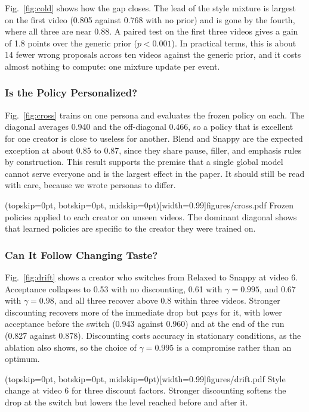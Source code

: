 \documentclass{ieeeaccess}
\begin{document}
Fig.~\ref{fig:cold} shows how the gap closes. The lead of the style mixture is largest on the first video (0.805 against 0.768 with no prior) and is gone by the fourth, where all three are near 0.88. A paired test on the first three videos gives a gain of 1.8 points over the generic prior ($p<0.001$). In practical terms, this is about 14 fewer wrong proposals across ten videos against the generic prior, and it costs almost nothing to compute: one mixture update per event.

\subsubsection{Is the Policy Personalized?}
Fig.~\ref{fig:cross} trains on one persona and evaluates the frozen policy on each. The diagonal averages 0.940 and the off-diagonal 0.466, so a policy that is excellent for one creator is close to useless for another. Blend and Snappy are the expected exception at about 0.85 to 0.87, since they share pause, filler, and emphasis rules by construction. This result supports the premise that a single global model cannot serve everyone and is the largest effect in the paper. It should still be read with care, because we wrote personas to differ.

\Figure[t!](topskip=0pt, botskip=0pt, midskip=0pt)[width=0.99\columnwidth]{figures/cross.pdf}
{Frozen policies applied to each creator on unseen videos. The dominant diagonal shows that learned policies are specific to the creator they were trained on.\label{fig:cross}}

\subsubsection{Can It Follow Changing Taste?}
Fig.~\ref{fig:drift} shows a creator who switches from Relaxed to Snappy at video 6. Acceptance collapses to 0.53 with no discounting, 0.61 with $\gamma=0.995$, and 0.67 with $\gamma=0.98$, and all three recover above 0.8 within three videos. Stronger discounting recovers more of the immediate drop but pays for it, with lower acceptance before the switch (0.943 against 0.960) and at the end of the run (0.827 against 0.878). Discounting costs accuracy in stationary conditions, as the ablation also shows, so the choice of $\gamma=0.995$ is a compromise rather than an optimum.

\Figure[t!](topskip=0pt, botskip=0pt, midskip=0pt)[width=0.99\columnwidth]{figures/drift.pdf}
{Style change at video 6 for three discount factors. Stronger discounting softens the drop at the switch but lowers the level reached before and after it.\label{fig:drift}}
\end{document}
